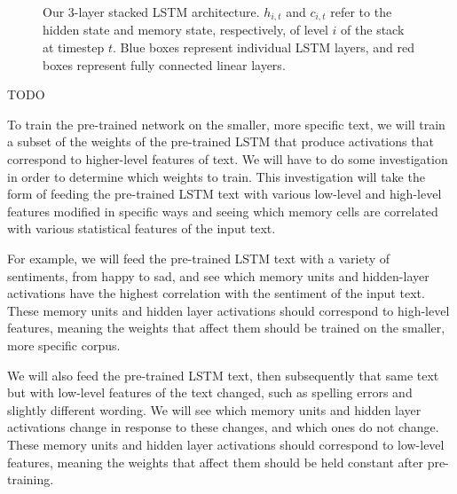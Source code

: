 \documentclass[10pt,twocolumn,letterpaper]{article}
\begin{document}
\begin{figure}
		\caption{Our 3-layer stacked LSTM architecture. $h_{i,t}$ and $c_{i,t}$ refer to the hidden state and memory state, respectively, of level $i$ of the stack at timestep $t$. Blue boxes represent individual LSTM layers, and red boxes represent fully connected linear layers.}
	\end{figure}
	TODO
	
	To train the pre-trained network on the smaller, more specific text, we will train a subset of the weights of the pre-trained LSTM that produce activations that correspond to higher-level features of text. We will have to do some investigation in order to determine which weights to train. This investigation will take the form of feeding the pre-trained LSTM text with various low-level and high-level features modified in specific ways and seeing which memory cells are correlated with various statistical features of the input text.
	
	For example, we will feed the pre-trained LSTM text with a variety of sentiments, from happy to sad, and see which memory units and hidden-layer activations have the highest correlation with the sentiment of the input text. These memory units and hidden layer activations should correspond to high-level features, meaning the weights that affect them should be trained on the smaller, more specific corpus.
	
	We will also feed the pre-trained LSTM text, then subsequently that same text but with low-level features of the text changed, such as spelling errors and slightly different wording. We will see which memory units and hidden layer activations change in response to these changes, and which ones do not change. These memory units and hidden layer activations should correspond to low-level features, meaning the weights that affect them should be held constant after pre-training.
	
\end{document}
